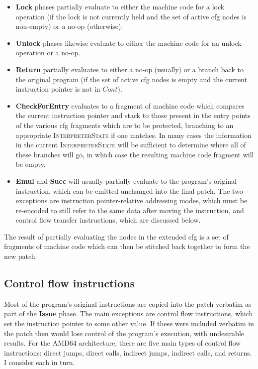 \begin{itemize}
\item \textbf{Lock} phases partially evaluate to either the machine
  code for a lock operation (if the lock is not currently held and the
  set of active \gls{cfg} nodes is non-empty) or a no-op (otherwise).

\item \textbf{Unlock} phases likewise evaluate to either the machine
  code for an unlock operation or a no-op.
\item \textbf{Return} partially evaluates to either a no-op (usually)
  or a branch back to the original program (if the set of active \gls{cfg}
  nodes is empty and the current instruction pointer is not in
  $\mathit{Cont}$).

\item \textbf{CheckForEntry} evaluates to a fragment of machine code
  which compares the current instruction pointer and stack to those
  present in the entry points of the various \gls{cfg} fragments which are
  to be protected, branching to an appropriate
  \textsc{InterpreterState} if one matches.  In many cases the
  information in the current \textsc{InterpreterState} will be
  sufficient to determine where all of these branches will go, in
  which case the resulting machine code fragment will be
  empty.

\item \textbf{Emul} and \textbf{Succ} will usually partially evaluate
  to the program's original instruction, which can be emitted
  unchanged into the final patch.  The two exceptions are instruction
  pointer-relative addressing modes, which must be re-encoded to still
  refer to the same data after moving the instruction, and control
  flow transfer instructions, which are discussed below.
\end{itemize}

The result of partially evaluating the nodes in the extended \gls{cfg} is a
set of fragments of machine code which can then be stitched back
together to form the new patch.

\subsection{Control flow instructions}

Most of the program's original instructions are copied into the patch
verbatim as part of the \textbf{Issue} phase.  The main exceptions are
control flow instructions, which set the instruction pointer to some
other value.  If these were included verbatim in the patch then
{\implementation} would lose control of the program's execution, with
undesirable results.  For the AMD64 architecture, there are five main
types of control flow instructions: direct jumps, direct calls,
indirect jumps, indirect calls, and returns.  I consider each in turn.

